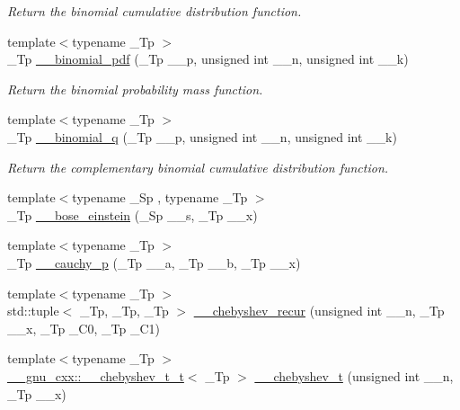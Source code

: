 \begin{DoxyCompactItemize}
\begin{DoxyCompactList}\small\item\em Return the binomial cumulative distribution function. \end{DoxyCompactList}\item 
{\footnotesize template$<$typename \+\_\+\+Tp $>$ }\\\+\_\+\+Tp \hyperlink{namespacestd_1_1____detail_acaeb596397431731cba684ca1f04cbfc}{\+\_\+\+\_\+binomial\+\_\+pdf} (\+\_\+\+Tp \+\_\+\+\_\+p, unsigned int \+\_\+\+\_\+n, unsigned int \+\_\+\+\_\+k)
\begin{DoxyCompactList}\small\item\em Return the binomial probability mass function. \end{DoxyCompactList}\item 
{\footnotesize template$<$typename \+\_\+\+Tp $>$ }\\\+\_\+\+Tp \hyperlink{namespacestd_1_1____detail_a710184fcff974a80bd9ba5862081042b}{\+\_\+\+\_\+binomial\+\_\+q} (\+\_\+\+Tp \+\_\+\+\_\+p, unsigned int \+\_\+\+\_\+n, unsigned int \+\_\+\+\_\+k)
\begin{DoxyCompactList}\small\item\em Return the complementary binomial cumulative distribution function. \end{DoxyCompactList}\item 
{\footnotesize template$<$typename \+\_\+\+Sp , typename \+\_\+\+Tp $>$ }\\\+\_\+\+Tp \hyperlink{namespacestd_1_1____detail_a75feb55399bc2c9c2ccff19877c8af2b}{\+\_\+\+\_\+bose\+\_\+einstein} (\+\_\+\+Sp \+\_\+\+\_\+s, \+\_\+\+Tp \+\_\+\+\_\+x)
\item 
{\footnotesize template$<$typename \+\_\+\+Tp $>$ }\\\+\_\+\+Tp \hyperlink{namespacestd_1_1____detail_ac92c91623b3e41c6384c977d5ec594e7}{\+\_\+\+\_\+cauchy\+\_\+p} (\+\_\+\+Tp \+\_\+\+\_\+a, \+\_\+\+Tp \+\_\+\+\_\+b, \+\_\+\+Tp \+\_\+\+\_\+x)
\item 
{\footnotesize template$<$typename \+\_\+\+Tp $>$ }\\std\+::tuple$<$ \+\_\+\+Tp, \+\_\+\+Tp, \+\_\+\+Tp $>$ \hyperlink{namespacestd_1_1____detail_a5fa9d67b4e0af4e0e018a06d198f0280}{\+\_\+\+\_\+chebyshev\+\_\+recur} (unsigned int \+\_\+\+\_\+n, \+\_\+\+Tp \+\_\+\+\_\+x, \+\_\+\+Tp \+\_\+\+C0, \+\_\+\+Tp \+\_\+\+C1)
\item 
{\footnotesize template$<$typename \+\_\+\+Tp $>$ }\\\hyperlink{struct____gnu__cxx_1_1____chebyshev__t__t}{\+\_\+\+\_\+gnu\+\_\+cxx\+::\+\_\+\+\_\+chebyshev\+\_\+t\+\_\+t}$<$ \+\_\+\+Tp $>$ \hyperlink{namespacestd_1_1____detail_ac23b4d357a95f4ba24503350999fd52d}{\+\_\+\+\_\+chebyshev\+\_\+t} (unsigned int \+\_\+\+\_\+n, \+\_\+\+Tp \+\_\+\+\_\+x)

\end{DoxyCompactItemize}
